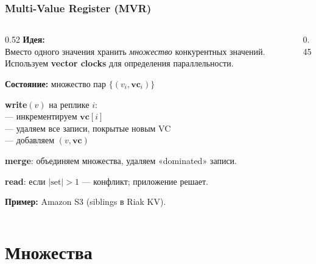 \documentclass{beamer}
\begin{document}
\begin{frame}
\frametitle{Multi-Value Register (MVR)}

\begin{columns}
\begin{column}{0.52\textwidth}
\textbf{Идея:}\\
Вместо одного значения хранить \emph{множество} конкурентных значений.
Используем \textbf{vector clocks} для определения параллельности.

\medskip
\textbf{Состояние:} множество пар $\{(v_i, \mathbf{vc}_i)\}$

\medskip
\textbf{write}$(v)$ на реплике $i$:\\
— инкрементируем $\mathbf{vc}[i]$\\
— удаляем все записи, покрытые новым VC\\
— добавляем $(v, \mathbf{vc})$

\medskip
\textbf{merge}: объединяем множества, удаляем «dominated» записи.

\medskip
\textbf{read}: если $|\text{set}|>1$ — конфликт; приложение решает.

\medskip
\textbf{Пример:} Amazon S3 (siblings в Riak KV).
\end{column}
\begin{column}{0.45\textwidth}
\end{column}
\end{columns}

\end{frame}

\section{Множества}
\end{document}
